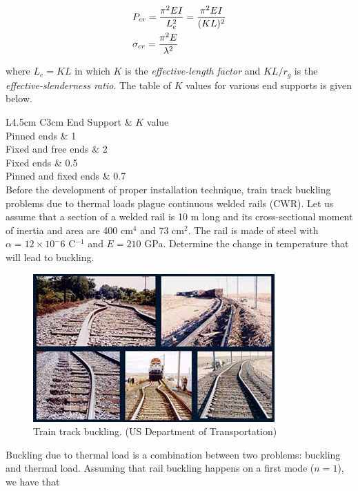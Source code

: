 \documentclass[a4paper,openany,nobib]{tufte-book}
\begin{document}
{{\begin{gather}
\label{eqn: Euler's formula}
  P_{cr} = \frac{\pi^2EI}{L_e^2} = \frac{\pi ^2EI}{(KL)^2} \hfill \\
  \sigma_{cr} = \frac{\pi ^2E}{\lambda^2} \hfill \\ 
\end{gather}

where \(L_e = KL\) in which \(K\) is the \emph{effective-length factor} and
\(KL/r_g\) is the \emph{effective-slenderness ratio}. The table of \(K\) values
for various end supports is given below.


 L4.5cm C3cm End Support \& \(K\) value\\
Pinned ends \& 1\\
Fixed and free ends \& 2\\
Fixed ends \& 0.5\\
Pinned and fixed ends \& 0.7\\

Before the development of proper installation technique, train track
buckling problems due to thermal loads plague continuous welded rails
(CWR). Let us assume that a section of a welded rail is 10 m long and
its cross-sectional moment of inertia and area are 400 cm\(^4\) and 73
cm\(^2\). The rail is made of steel with \(\alpha = 12 \times 10^-6\)
C\(^{-1}\) and \(E = 210\) GPa. Determine the change in temperature that
will lead to buckling.


\begin{figure}[htbp]
\centering
\includegraphics[width=.9\linewidth]{pictures/Failure-theories/Rail_buckle.jpg}
\caption{Train track buckling. (US Department of Transportation)}
\end{figure}

Buckling due to thermal load is a combination between two problems:
buckling and thermal load. Assuming that rail buckling happens on a
first mode (\(n = 1\)), we have that

}}
\end{document}
